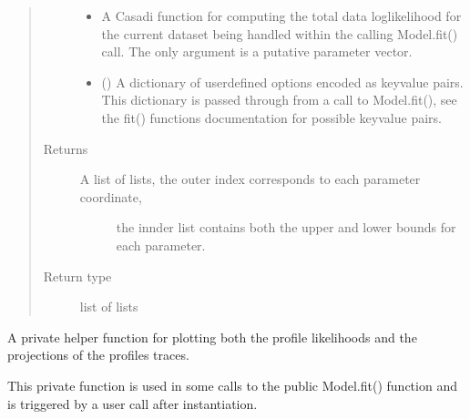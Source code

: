 \documentclass[letterpaper,10pt,english,openany,oneside]{sphinxmanual}
\begin{document}
\begin{fulllineitems}
\begin{fulllineitems}
\begin{quote}
\begin{description}
\begin{itemize}
\item {} 
 \textendash{} A Casadi function for computing the total data log\sphinxhyphen{}likelihood for the
current dataset being handled within the calling Model.fit() call. The only argument
is a putative parameter vector.

\item {} 
 () \textendash{} A dictionary of user\sphinxhyphen{}defined options encoded as key\sphinxhyphen{}value
pairs. This dictionary is passed through from a call to Model.fit(), see
the fit() functions documentation for possible key\sphinxhyphen{}value pairs.

\end{itemize}

\item[{Returns}] \leavevmode
\begin{description}
\item[{A list of lists, the outer index corresponds to each parameter coordinate,}] \leavevmode
the innder list contains both the upper and lower bounds for each parameter.

\end{description}


\item[{Return type}] \leavevmode
list of lists

\end{description}\end{quote}

\end{fulllineitems}


\begin{fulllineitems}
\label{\detokenize{nloed:nloed.model.Model.__profile_plot}}
A private helper function for plotting both the profile likelihoods and the projections
of the profiles traces.

This private function is used in some calls to the public Model.fit() function and is
triggered by a user call after instantiation.


\end{fulllineitems}
\end{fulllineitems}
\end{document}
